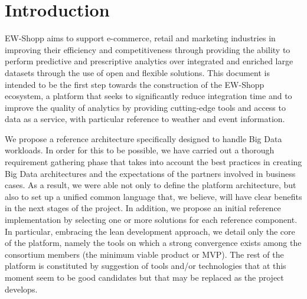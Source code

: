 \section{Introduction}

EW-Shopp aims to support e-commerce, retail and marketing industries in improving their efficiency and competitiveness through providing the ability to perform predictive and prescriptive analytics over integrated and enriched large datasets through the use of open and flexible solutions. 
This document is intended to be the first step towards the construction of the EW-Shopp ecosystem, a platform that seeks to significantly reduce integration time and to improve the quality of analytics by providing cutting-edge tools and access to data as a service, with particular reference to weather and event information.  

We propose a reference architecture specifically designed to handle Big Data workloads. 
In order for this to be possible, we have carried out a thorough requirement gathering phase that takes into account the best practices in creating Big Data architectures and the expectations of the partners involved in business cases. As a result, we were able not only to define the platform architecture, but also to set up a unified common language that, we believe, will have clear benefits in the next stages of the project.
In addition, we propose an initial reference implementation by selecting one or more solutions for each reference component. In particular, embracing the lean development approach, we detail only the core of the platform, namely the tools on which a strong convergence exists among the consortium members (the minimum viable product or MVP). The rest of the platform is constituted by suggestion of tools and/or technologies that at this moment seem to be good candidates but that may be replaced as the project develops. 

